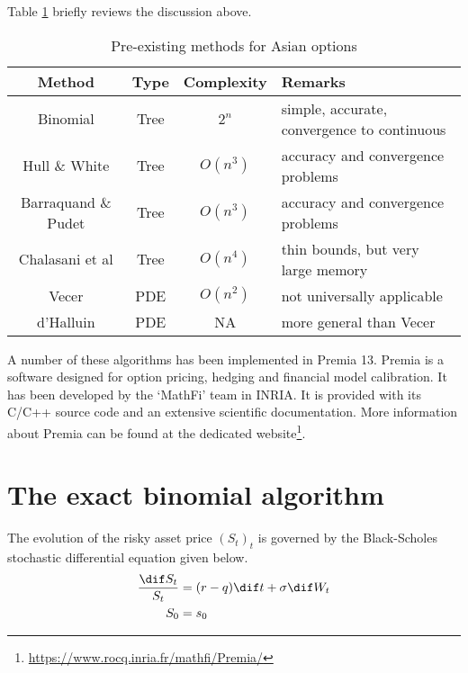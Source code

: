 Table \ref{tab:asian-literature-review} briefly reviews the discussion above.
\begin{table}[h]
	\label{tab:asian-literature-review}
	\centering
	\caption{Pre-existing methods for Asian options}
	\begin{tabular}{cccl}
		\toprule
		Method  &  Type  &  Complexity  &  Remarks  \\
		\midrule
		Binomial  &  Tree  &  $ 2^n $  &  simple, accurate, convergence to continuous  \\
		Hull \& White  &  Tree  &  $ O(n^3) $  &  accuracy and convergence problems  \\
		Barraquand \& Pudet  &  Tree  &  $ O(n^3) $  &  accuracy and convergence problems  \\
		Chalasani et al  &  Tree  &  $ O(n^4) $  &  thin bounds, but very large memory  \\
		Vecer  &  PDE  &  $ O(n^2) $  &  not universally applicable  \\
		d'Halluin  &  PDE  &  NA  &  more general than Vecer \\
		\bottomrule
	\end{tabular}
\end{table}


A number of these algorithms has been implemented in Premia 13. Premia is a software designed for option pricing, hedging and financial model calibration. It has been developed by the `MathFi' team in INRIA. It is provided with its C/C++ source code and an extensive scientific documentation. More information about Premia can be found at the dedicated  website\footnote{\url{https://www.rocq.inria.fr/mathfi/Premia/}}.


\section{The exact binomial algorithm}
\label{sec:asian-binom}
The evolution of the risky asset price $ (S_t)_t $ is governed by the Black-Scholes stochastic differential equation given below.
\begin{subequations}
	\begin{align*}
		\frac{\dif S_t}{S_t}  &=  (r - q) \dif t + \sigma \dif W_t  \\
		S_0  &=  s_0
	\end{align*}
\end{subequations}

